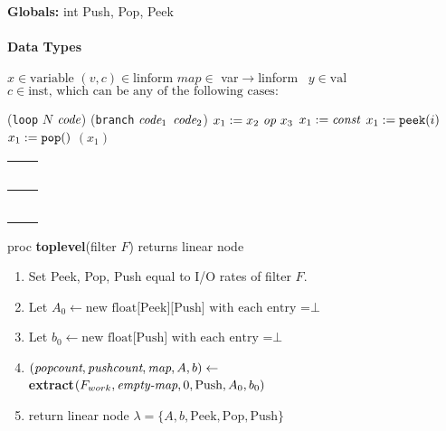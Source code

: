 \newcommand{\maptype}{var$\rightarrow$linform~}
\newcommand{\la}{$\leftarrow$}
\newcommand{\IND}{\begin{ALC@g}}
\newcommand{\UND}{\end{ALC@g}}

\begin{algorithm}
{\bf Globals:} int Push, Pop, Peek \\ ~ \\
%
{\bf Data Types}
\begin{algorithmic}
\STATE $x \in \mbox{variable}$
\STATE $(v, c) \in \mbox{linform}$
\STATE $map \in $ \maptype
\STATE $y \in \mbox{val}$
\STATE $c \in \mbox{inst, which can be any of the following cases:}$
\IND
\STATE ({\tt loop} $N$ $\mbox{\it code}$)
\STATE ({\tt branch} $\mbox{\it code}_1$ $\mbox{\it code}_2$)
\STATE $x_1 := x_2~\mbox{\it op}~x_3$
\STATE $x_1 := \mbox{\it const}$
\STATE $x_1 := \mbox{\tt peek}(i)$
\STATE $x_1 := \mbox{\tt pop}()$
$(x_1)$
\UND
\end{algorithmic}
\begin{tabular}{l}
~\hspace{3in}~ \\
\hline \\
~\hspace{3in}~ 
\end{tabular}
proc {\bf toplevel}(filter $F$) returns linear node
\begin{enumerate}
\item Set Peek, Pop, Push equal to I/O rates of filter $F$.
\item Let $A_{0} \leftarrow \mbox{new float[Peek][Push] with each entry =} \bot$
\item Let $b_{0} \leftarrow \mbox{new float[Push] with each entry =} \bot$
\item $(\mbox{\it popcount}, \mbox{\it pushcount}, \mbox{\it map}, A, b) \leftarrow$ \\
{\bf extract}$(F_{work}, \mbox{\it empty-map}, 0, \mbox{Push}, A_{0}, b_{0})$
\item
\begin{algorithmic}
\STATE return linear node $\lambda = \{A, b, \mbox{Peek}, \mbox{Pop}, \mbox{Push}\}$
\ELSE
{}
\ENDIF
\end{algorithmic}
\end{enumerate}
\begin{tabular}{l}

\end{tabular}
\end{algorithm}
